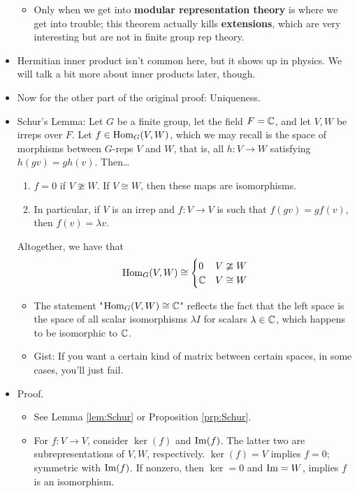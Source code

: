\documentclass[../notes.tex]{subfiles}
\begin{document}
\begin{itemize}
    \begin{itemize}
        \item Only when we get into \textbf{modular representation theory} is where we get into trouble; this theorem actually kills \textbf{extensions}, which are very interesting but are not in finite group rep theory.
    \end{itemize}
    \item Hermitian inner product isn't common here, but it shows up in physics. We will talk a bit more about inner products later, though.
    \item Now for the other part of the original proof: Uniqueness.
    \item Schur's Lemma: Let $G$ be a finite group, let the field $F=\mathbb{C}$, and let $V,W$ be irreps over $F$. Let $f\in\operatorname{Hom}_G(V,W)$, which we may recall is the space of morphisms between $G$-reps $V$ and $W$, that is, all $h:V\to W$ satisfying $h(gv)=gh(v)$. Then\dots
    \begin{enumerate}
        \item $f=0$ if $V\ncong W$. If $V\cong W$, then these maps are isomorphisms.
        \item In particular, if $V$ is an irrep and $f:V\to V$ is such that $f(gv)=gf(v)$, then $f(v)=\lambda v$.
    \end{enumerate}
    Altogether, we have that
    \begin{equation*}
        \operatorname{Hom}_G(V,W) \cong
        \begin{cases}
            0 & V\ncong W\\
            \mathbb{C} & V\cong W
        \end{cases}
    \end{equation*}
    \begin{itemize}
        \item The statement "$\operatorname{Hom}_G(V,W)\cong\mathbb{C}$" reflects the fact that the left space is the space of all scalar isomorphisms $\lambda I$ for scalars $\lambda\in\mathbb{C}$, which happens to be isomorphic to $\mathbb{C}$.
        \item Gist: If you want a certain kind of matrix between certain spaces, in some cases, you'll just fail.
    \end{itemize}
    \item Proof.
    \begin{itemize}
        \item See Lemma \ref{lem:Schur} or Proposition \ref{prp:Schur}.
        \item For $f:V\to V$, consider $\ker(f)$ and $\operatorname{Im}(f)$. The latter two are subrepresentations of $V,W$, respectively. $\ker(f)=V$ implies $f=0$; symmetric with $\operatorname{Im}(f)$. If nonzero, then $\ker=0$ and $\operatorname{Im}=W$, implies $f$ is an isomorphism.

\end{itemize}
\end{itemize}
\end{document}
